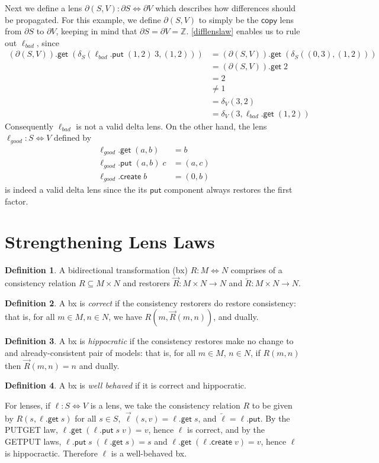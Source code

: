 \documentclass[acmsmall,review,anonymous]{acmart}\settopmatter{printfolios=true,printccs=false,printacmref=false}
\theoremstyle{definition}
\newtheorem{definition}{Definition}
\newcommand{\kw}[1]{\ensuremath{\mathsf{#1}}\xspace}
\newcommand{\get}{\ensuremath{\kw{get}}\xspace}
\newcommand{\pput}{\ensuremath{\kw{put}}\xspace}
\newcommand{\create}{\ensuremath{\kw{create}}\xspace}
\newcommand{\ccopy}{\ensuremath{\kw{copy}}\xspace}
\begin{document}
Next we define a lens $\partial(S, V) : \partial S \Leftrightarrow \partial V$
which describes how differences should be propagated. For this example, we
define $\partial(S,V)$ to simply be the \ccopy lens from $\partial S$ to
$\partial V$, keeping in mind that $\partial S = \partial V = \mathbb{Z}$.
\cref{difflenslaw} enables us to rule out $\ell_{bad}$, since
\begin{align*}
(\partial (S, V)).\get \; (\delta_S(\ell_{bad}.\pput \; (1,2) \; 3, (1,2))) &=
(\partial (S, V)).\get \; (\delta_S((0,3), (1,2)))\\
&= (\partial (S, V)).\get \; 2\\
&= 2\\
&\neq 1\\
&= \delta_V(3, 2)\\
&= \delta_V(3, \ell_{bad}.\get \; (1, 2))
\end{align*}
Consequently $\ell_{bad}$ is not a valid delta lens. On the
other hand, the lens $\ell_{good} : S \Leftrightarrow V$ defined by
\begin{align*}
\ell_{good}.\get \; (a, b) &= b\\
\ell_{good}.\pput \; (a, b) \; c &= (a, c)\\
\ell_{good}.\create \; b &= (0, b)
\end{align*}
is indeed a valid delta lens since the its \pput component always restores the
first factor.

\section{Strengthening Lens Laws}
\begin{definition}
A bidirectional transformation (bx) $R: M \Leftrightarrow N$ comprises of a
consistency relation $R \subseteq M \times N$ and restorers $\overrightarrow{R}
: M \times N \rightarrow N$ and $\overleftarrow{R} : M \times N \longrightarrow
N$.
\end{definition}
\begin{definition}
A bx is {\em correct} if the consistency restorers do restore consistency:
that is, for all $m \in M, n \in N$, we have $R(m, \overrightarrow{R}(m, n))$,
and dually.
\end{definition}
\begin{definition}
A bx is {\em hippocratic} if the consistency restores make no change
to and already-consistent pair of models: that is, for all $m \in M$, $n \in N$,
if $R(m, n)$ then $\overrightarrow{R}(m, n) = n$ and dually.
\end{definition}
\begin{definition}
A bx is {\em well behaved} if it is correct and hippocratic.
\end{definition}
For lenses, if $\ell : S \Leftrightarrow V$ is a lens, we take the
consistency relation $R$ to be given by $R(s, \ell.\get \; s)$ for all $s \in
S$, $\overrightarrow{\ell}(s, v) = \ell.\get \; s$, and $\overleftarrow{\ell} =
\ell.\pput$. By the PUTGET law, $\ell.\get \; (\ell.\pput \; s \; v) = v$,
hence $\ell$ is correct, and by the GETPUT laws, $\ell.\pput \; s \; (\ell.\get
\; s) = s$ and $\ell.\get \; (\ell.\create \; v) = v$, hence $\ell$ is
hippocractic. Therefore $\ell$ is a well-behaved bx.
\end{document}
